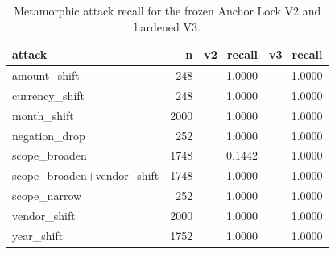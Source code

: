 \begin{table}
\caption{Metamorphic attack recall for the frozen Anchor Lock V2 and hardened V3.}
\label{tab:anchor-v3}
\begin{tabular}{lrrr}
\toprule
attack & n & v2_recall & v3_recall \\
\midrule
amount_shift & 248 & 1.0000 & 1.0000 \\
currency_shift & 248 & 1.0000 & 1.0000 \\
month_shift & 2000 & 1.0000 & 1.0000 \\
negation_drop & 252 & 1.0000 & 1.0000 \\
scope_broaden & 1748 & 0.1442 & 1.0000 \\
scope_broaden+vendor_shift & 1748 & 1.0000 & 1.0000 \\
scope_narrow & 252 & 1.0000 & 1.0000 \\
vendor_shift & 2000 & 1.0000 & 1.0000 \\
year_shift & 1752 & 1.0000 & 1.0000 \\
\bottomrule
\end{tabular}
\end{table}
